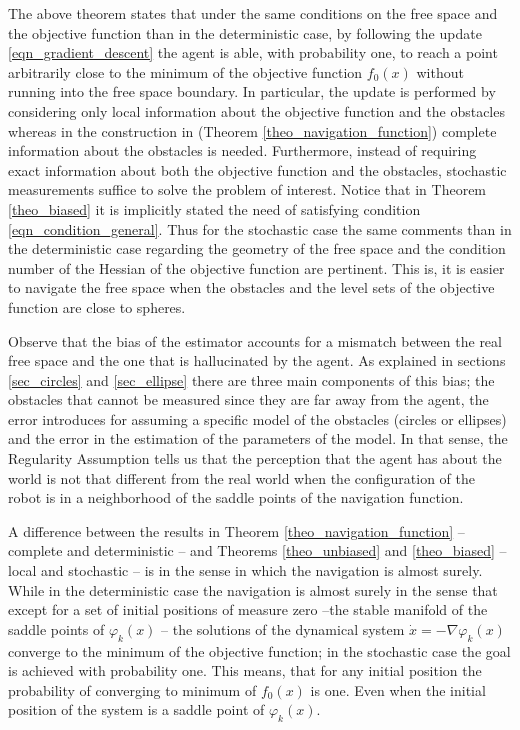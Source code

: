 \documentclass[article]{IEEEtran}
\theoremstyle{definition}
\begin{document}
%
The above theorem states that under the same conditions on the free space and the objective function than in the deterministic case, by following the update \eqref{eqn_gradient_descent} the agent is able, with probability one, to reach a point arbitrarily close to the minimum of the objective function $f_0(x)$ without running into the free space boundary. In particular, the update is performed by considering only local information about the objective function and the obstacles whereas in the construction in \cite{PaternainEtal15} (Theorem \ref{theo_navigation_function}) complete information about the obstacles is needed. Furthermore, instead of requiring exact information about both the objective function and the obstacles, stochastic measurements suffice to solve the problem of interest. Notice that in Theorem \ref{theo_biased} it is implicitly stated the need of satisfying condition \eqref{eqn_condition_general}. Thus for the stochastic case the same comments than in the deterministic case regarding the geometry of the free space and the condition number of the Hessian of the objective function are pertinent. This is, it is easier to navigate the free space when the obstacles and the level sets of the objective function are close to spheres.

Observe that the bias of the estimator accounts for a mismatch between the real free space and the one that is hallucinated by the agent. As explained in sections \ref{sec_circles} and \ref{sec_ellipse} there are three main components of this bias; the obstacles that cannot be measured since they are far away from the agent, the error introduces for assuming a specific model of the obstacles (circles or ellipses) and the error in the estimation of the parameters of the model. In that sense, the Regularity Assumption tells us that the perception that the agent has about the world is not that different from the real world when the configuration of the robot is in a neighborhood of the saddle points of the navigation function.

A difference between the results in Theorem \ref{theo_navigation_function} -- complete and deterministic -- and Theorems \ref{theo_unbiased} and \ref{theo_biased} -- local and stochastic -- is in the sense in which the navigation is almost surely. While in the deterministic case the navigation is almost surely in the sense that except for a set of initial positions of measure zero --the stable manifold of the saddle points of $\varphi_k(x)$ -- the solutions of the dynamical system $\dot{x}= -\nabla \varphi_k(x)$ converge to the minimum of the objective function; in the stochastic case the goal is achieved with probability one. This means, that for any initial position the probability of converging to minimum of $f_0(x)$ is one. Even when the initial position of the system is a saddle point of $\varphi_k(x)$. 
%
%
\end{document}
